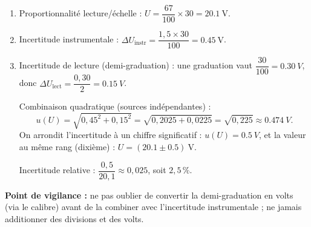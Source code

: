 \documentclass[11pt]{article}
\begin{document}
\begin{corrige}
\begin{enumerate}
    \item Proportionnalité lecture/échelle : $U = \dfrac{67}{100} \times 30 = \boxed{\num{20,1}~\text{V}}$.
    \item Incertitude instrumentale : $\Delta U_{\text{instr}} = \dfrac{1,5 \times 30}{100} = \boxed{\num{0,45}~\text{V}}$.
    \item Incertitude de lecture (demi-graduation) : une graduation vaut $\dfrac{30}{100} = \SI{0,30}{V}$, donc $\Delta U_{\text{lect}} = \dfrac{0,30}{2} = \SI{0,15}{V}$.

    Combinaison quadratique (sources indépendantes) :
    \[ u(U) = \sqrt{0,45^2 + 0,15^2} = \sqrt{0,2025 + 0,0225} = \sqrt{0,225} \approx \SI{0,474}{V}. \]
    On arrondit l'incertitude à un chiffre significatif : $u(U) = \SI{0,5}{V}$, et la valeur au même rang (dixième) : $\boxed{U = (\num{20,1} \pm \num{0,5})~\text{V}}$.

    Incertitude relative : $\dfrac{0,5}{20,1} \approx 0,025$, soit $\boxed{2,5\,\%}$.
\end{enumerate}
\textbf{Point de vigilance :} ne pas oublier de convertir la demi-graduation en volts (via le calibre) avant de la combiner avec l'incertitude instrumentale ; ne jamais additionner des divisions et des volts.
\end{corrige}
\end{document}
